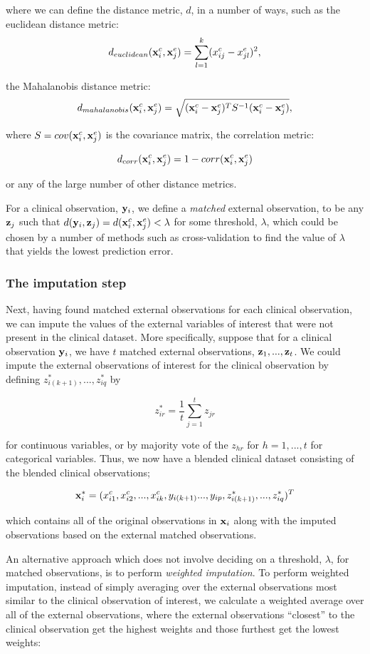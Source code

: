 \documentclass{article}
\begin{document}
where we can define the distance metric, $d$, in a number of ways, such as the euclidean distance metric:
$$d_{euclidean}({\bf x}_i^c, {\bf x}_j^e) = \sum_{l=1}^k(x_{ij}^c - x_{jl}^e)^2,$$

the Mahalanobis distance metric:
$$d_{mahalanobis}({\bf x}_i^c, {\bf x}_j^e) = \sqrt{({\bf x}_i^c - {\bf x}_j^e)^T S^{-1}({\bf x}_i^c - {\bf x}_j^e)},$$

where $S = cov({\bf x}_i^c, {\bf x}_j^e)$ is the covariance matrix, the correlation metric:

$$d_{corr}({\bf x}_i^c, {\bf x}_j^e) = 1 - corr({\bf x}_i^c, {\bf x}_j^e)$$

or any of the large number of other distance metrics.


For a clinical observation, ${\bf y}_i$, we define a \emph{matched} external observation, to be any ${\bf z}_j$ such that $d({\bf y}_i, {\bf z}_j) = d({\bf x}^c_i, {\bf x}^e_j) < \lambda$ for some threshold, $\lambda$, which could be chosen by a number of methods such as cross-validation to find the value of $\lambda$ that yields the lowest prediction error. 

\subsubsection{The imputation step}


Next, having found matched external observations for each clinical observation, we can impute the values of the external variables of interest that were not present in the clinical dataset. More specifically, suppose that for a clinical observation ${\bf y}_i$, we have $t$ matched external observations, ${\bf z}_1, ..., {\bf z}_t$. We could impute the external observations of interest for the clinical observation by  defining $z^*_{i(k+1)}, ..., z^*_{iq}$ by

$$z^*_{ir} = \frac{1}{t} \sum_{j=1}^t z_{jr}$$

for continuous variables, or by majority vote of the $z_{hr}$ for $h = 1, ..., t$ for categorical variables. Thus, we now have a blended clinical dataset consisting of the blended clinical observations;

$${\bf x}^*_i = (x^c_{i1}, x^c_{i2}, ..., x^c_{ik}, y_{i(k+1)} ..., y_{ip}, z_{i(k+1)}^*, ..., z_{iq}^*)^T$$

which contains all of the original observations in ${\bf x}_i$ along with the imputed observations based on the external matched observations.

An alternative approach which does not involve deciding on a threshold, $\lambda$, for matched observations, is to perform \emph{weighted imputation}. To perform weighted imputation, instead of simply averaging over the external observations most similar to the clinical observation of interest, we calculate a weighted average over all of the external observations, where the external observations ``closest'' to the clinical observation get the highest weights and those furthest get the lowest weights:
\end{document}
